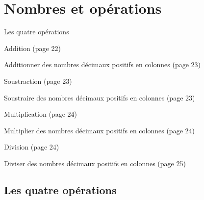 \documentclass[a4paper,11pt]{report}
\begin{document}
\newcommand{\chapterName}{Nombres et opérations}
\newcommand{\serieName}{Les quatre opérations}


\chapter*{\chapterName}
\thispagestyle{empty}

\begin{amL}{\serieName}{
\item Addition (page 22)
\item Additionner des nombres décimaux positifs en colonnes (page 23)
\item Soustraction (page 23)
\item Soustraire des nombres décimaux positifs en colonnes (page 23)
\item Multiplication (page 24)
\item Multiplier des nombres décimaux positifs en colonnes (page 24)
\item Division (page 24)
\item Diviser des nombres décimaux positifs en colonnes (page 25)
}
\end{amL}
\section*{\serieName}
\setcounter{page}{1}
\thispagestyle{firstPage}



\end{document}
